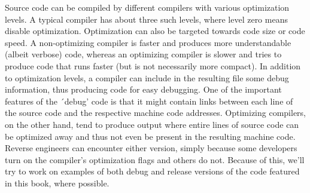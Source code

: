 Source code can be compiled by different compilers with various optimization levels.
A typical compiler has about three such levels, where level zero means disable optimization.
Optimization can also be targeted towards code size or code speed.
A non-optimizing compiler is faster and produces more understandable (albeit verbose) code,
whereas an optimizing compiler is slower and tries to produce code that runs faster (but is not necessarily more compact).
In addition to optimization levels, a compiler can include in the resulting file some debug information,
thus producing code for easy debugging.
One of the important features of the ´debug' code is that it might contain links
between each line of the source code and the respective machine code addresses.
Optimizing compilers, on the other hand, tend to produce output where entire lines of source code
can be optimized away and thus not even be present in the resulting machine code.
Reverse engineers can encounter either version, simply because some developers turn on the compiler's optimization flags and others do not.
Because of this, we'll try to work on examples of both debug and release versions of the code featured in this book, where possible.
